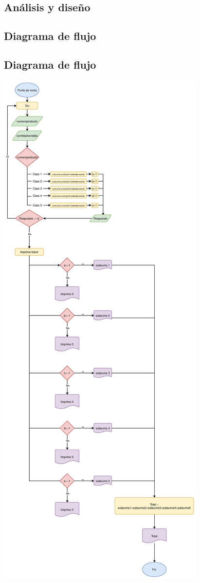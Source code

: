 \documentclass{article}
\begin{document}
\begin{center}
\section{Análisis y diseño}
\subsection{Diagrama de flujo}

\subsection{Diagrama de flujo}
\begin{center}
 	\includegraphics[scale=0.35]{images/Diagrama.eps}
 	\label{figura4}
 \end{center}
\end{center}
\end{document}
